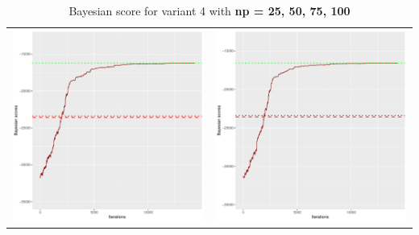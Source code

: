 \documentclass[]{scrartcl}
\begin{document}
\begin{table}[h!]
\begin{tabular}{cc}
\includegraphics[scale = 0.4]{./figs/win95pts/v4/75/bayBoundsEvolution-14252.pdf} & 
\includegraphics[scale = 0.4]{./figs/win95pts/v4/100/bayBoundsEvolution-14252.pdf} \\
\end{tabular}
\caption{Bayesian score for variant 4 with \textbf{np =  25, 50, 75, 100 }}
\end{table}
\end{document}
